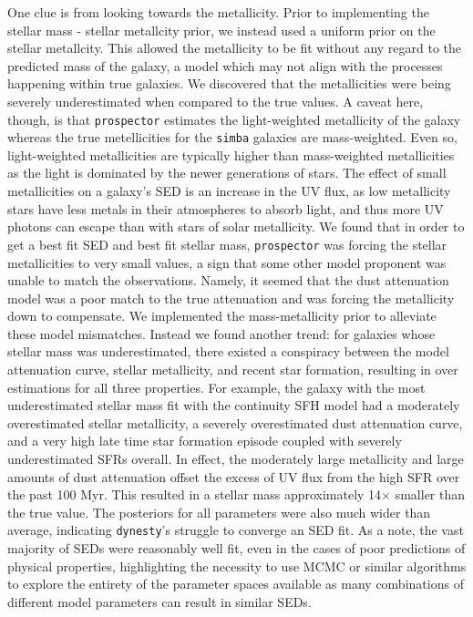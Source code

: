 \documentclass[twocolumn]{aastex62}
\begin{document}
One clue is from looking towards the metallicity. Prior to implementing the \cite{gallazzi_ages_2005} stellar mass - stellar metallcity prior, we instead used a uniform prior on the stellar metallcity. This allowed the metallicity to be fit without any regard to the predicted mass of the galaxy, a model which may not align with the processes happening within true galaxies. We discovered that the metallicities were being severely underestimated when compared to the true values. A caveat here, though, is that \texttt{prospector} estimates the light-weighted metallicity of the galaxy whereas the true metellicities for the \texttt{simba} galaxies are mass-weighted. Even so, light-weighted metallicities are typically higher than mass-weighted metallicities as the light is dominated by the newer generations of stars. The effect of small metallicities on a galaxy's SED is an increase in the UV flux, as low metallicity stars have less metals in their atmospheres to absorb light, and thus more UV photons can escape than with stars of solar metallicity. We found that in order to get a best fit SED and best fit stellar mass, \texttt{prospector} was forcing the stellar metallicities to very small values, a sign that some other model proponent was unable to match the observations. Namely, it seemed that the dust attenuation model was a poor match to the true attenuation and was forcing the metallicity down to compensate. We implemented the \cite{gallazzi_ages_2005} mass-metallicity prior to alleviate these model mismatches. Instead we found another trend: for galaxies whose stellar mass was underestimated, there existed a conspiracy between the model attenuation curve, stellar metallicity, and recent star formation, resulting in over estimations for all three properties. For example, the galaxy with the most underestimated stellar mass fit with the continuity SFH model had a moderately overestimated stellar metallicity, a severely overestimated dust attenuation curve, and a very high late time star formation episode coupled with severely underestimated SFRs overall. In effect, the moderately large metallicity and large amounts of dust attenuation offset the excess of UV flux from the high SFR over the past 100 Myr.  This resulted in a stellar mass approximately 14$\times$ smaller than the true value. The posteriors for all parameters were also much wider than average, indicating \texttt{dynesty}'s struggle to converge an SED fit. As a note, the vast majority of SEDs were reasonably well fit, even in the cases of poor predictions of physical properties, highlighting the necessity to use MCMC or similar algorithms to explore the entirety of the parameter spaces available as many combinations of different model parameters can result in similar SEDs. 
\end{document}
